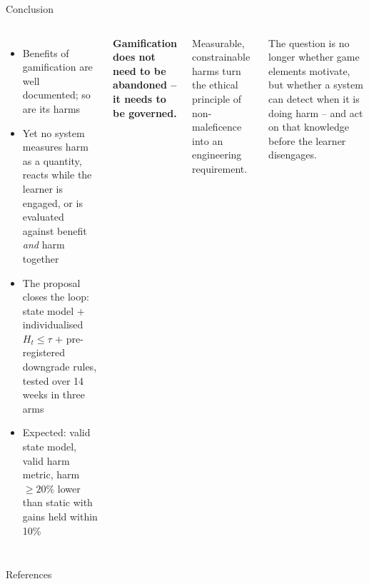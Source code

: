\documentclass[10pt]{beamer}
\begin{document}
\begin{frame}{Conclusion}
\begin{columns}[T]
    \begin{itemize}
        \item Benefits of gamification are well documented; so are its harms
        \item Yet no system measures harm as a quantity, reacts while the learner is engaged,
        or is evaluated against benefit \emph{and} harm together
        \item The proposal closes the loop: state model $+$ individualised $H_t \le \tau$
        $+$ pre-registered downgrade rules, tested over 14 weeks in three arms
        \item Expected: valid state model, valid harm metric, harm $\ge 20\%$ lower than static
        with gains held within 10\%
    \end{itemize}
    \begin{keybox}
    \textbf{Gamification does not need to be abandoned -- it needs to be governed.}
    \end{keybox}
    \vspace{0.1cm}
    Measurable, constrainable harms turn the ethical principle of non-maleficence into an
    engineering requirement.
    \vspace{0.1cm}
    \begin{alertblock}{The question is no longer whether game elements motivate, but whether a
    system can detect when it is doing harm -- and act on that knowledge before the learner
    disengages.}
    \end{alertblock}
\end{columns}
\end{frame}


\begin{frame}[allowframebreaks]{References}
\renewcommand*{\bibfont}{\footnotesize}
\setlength{\bibitemsep}{1.5pt}
\printbibliography
\end{frame}
\end{document}
